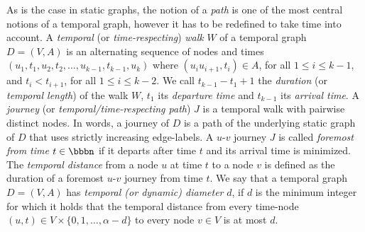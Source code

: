 \documentclass[oribibl, 11pt]{llncs}
\begin{document}
As is the case in static graphs, the notion of a \emph{path} is one of the most central notions of a temporal graph, however it has to be redefined to take time into account. A \emph{temporal} (or \emph{time-respecting}) \emph{walk} $W$ of a temporal graph $D=(V,A)$ is an alternating sequence of nodes and times $(u_1,t_1,u_2,t_2,\ldots,u_{k-1},t_{k-1},u_k)$ where $(u_iu_{i+1},t_i)\in A$, for all $1\leq i\leq k-1$, and $t_i<t_{i+1}$, for all $1\leq i\leq k-2$. We call $t_{k-1}-t_1+1$ the \emph{duration} (or \emph{temporal length}) of the walk $W$, $t_1$ its \emph{departure time} and $t_{k-1}$ its \emph{arrival time}. A \emph{journey} (or \emph{temporal/time-respecting path}) $J$ is a temporal walk with pairwise distinct nodes. In words, a journey of $D$ is a path of the underlying static graph of $D$ that uses strictly increasing edge-labels. A $u$-$v$ journey $J$ is called \emph{foremost from time $t\in\bbbn$} if it departs after time $t$ and its arrival time is minimized. The \emph{temporal distance} from a node $u$ at time $t$ to a node $v$ is defined as the duration of a foremost $u$-$v$ journey from time $t$. We say that a temporal graph $D=(V,A)$ has \emph{temporal (or dynamic) diameter} $d$, if $d$ is the minimum integer for which it holds that the temporal distance from every time-node $(u,t)\in V\times \{0,1,\ldots,\alpha-d\}$ to every node $v\in V$ is at most $d$.
\end{document}
